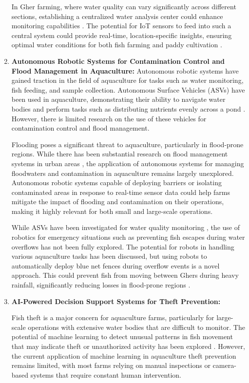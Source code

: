 \documentclass[conference]{IEEEtran}
\begin{document}
\begin{enumerate}
In Gher farming, where water quality can vary significantly across different sections, establishing a centralized water analysis center could enhance monitoring capabilities \cite{ref17}. The potential for IoT sensors to feed into such a central system could provide real-time, location-specific insights, ensuring optimal water conditions for both fish farming and paddy cultivation \cite{ref18}.

	\item \textbf{Autonomous Robotic Systems for Contamination Control and Flood Management in Aquaculture: }
	Autonomous robotic systems have gained traction in the field of aquaculture for tasks such as water monitoring, fish feeding, and sample collection. Autonomous Surface Vehicles (ASVs) have been used in aquaculture, demonstrating their ability to navigate water bodies and perform tasks such as distributing nutrients evenly across a pond \cite{ref19}. However, there is limited research on the use of these vehicles for contamination control and flood management.

Flooding poses a significant threat to aquaculture, particularly in flood-prone regions. While there has been substantial research on flood management systems in urban areas \cite{ref20}, the application of autonomous systems for managing floodwaters and contamination in aquaculture remains largely unexplored. Autonomous robotic systems capable of deploying barriers or isolating contaminated areas in response to real-time sensor data could help farms mitigate the impact of flooding and contamination on their operations, making it highly relevant for both small and large-scale operations.

While ASVs have been investigated for water quality monitoring \cite{ref19}, the use of robotics for emergency situations such as preventing fish escapes during water overflows has not been fully explored. The potential for robots in handling various aquaculture tasks has been discussed, but using robots to automatically deploy blue net fences during overflow events is a novel approach. This could prevent fish from moving between Ghers during heavy rainfall, significantly reducing losses in flood-prone regions \cite{ref21}.

\item \textbf{AI-Powered Decision Support Systems for Theft Prevention: }

Fish theft is a major concern for aquaculture farms, particularly for large-scale operations with extensive water bodies that are difficult to monitor. The potential of machine learning to detect unusual patterns in fish movement that may indicate theft or unauthorized activity has been explored \cite{ref22}. However, the current application of machine learning in aquaculture theft prevention remains limited, with most farms relying on manual inspections or camera-based systems that require constant human intervention.


\end{enumerate}
\end{document}
